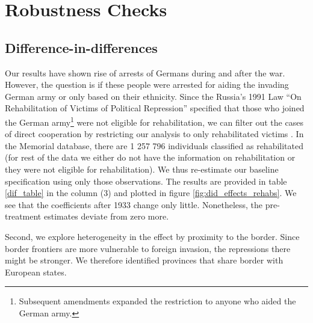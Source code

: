 

\section{Robustness Checks} \label{subsec:robust_checks}
\subsection{Difference-in-differences}

Our results have shown rise of arrests of Germans during and after the war. 
However, the question is if these people were arrested for aiding the invading German army or only based on their ethnicity. 
Since the  Russia’s 1991 Law  \enquote{On Rehabilitation of Victims of Political Repression} specified  that those who joined the German army\footnote{Subsequent amendments expanded the restriction to anyone who aided the German army. }  were not eligible for rehabilitation, we can filter out the cases of direct 
cooperation by restricting  our analysis to only rehabilitated victims \citep{frierson_russias_2014}. 
In the Memorial database, there  are 1 257 796 individuals  classified as  rehabilitated (for rest of the data we either do not have the information on rehabilitation or they were not eligible for rehabilitation).  We thus re-estimate our baseline specification using only those observations. The results are provided in table \ref{dif_table} in the column (3) and plotted in figure \ref{fig:did_effects_rehabs}. We see that the coefficients after 1933 change only little. Nonetheless, the pre-treatment estimates deviate from zero more. 

Second, we explore heterogeneity in the effect by proximity to the border.
Since border frontiers are more vulnerable to foreign invasion, the repressions there might be stronger. 
We therefore identified  provinces that share border with European states. 

